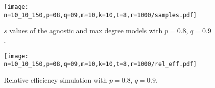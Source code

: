 \documentclass{article}
\begin{document}
\begin{figure}[h]
\centering
\texttt{[image: n=10\_10\_150,p=08,q=09,m=10,k=10,t=8,r=1000/samples.pdf]}
\caption{$s$ values of the agnostic and max degree models with $p=0.8$, $q=0.9$.}
\label{fig:p08_q09_s_val}
\end{figure}
\begin{figure}[h]
\centering
\texttt{[image: n=10\_10\_150,p=08,q=09,m=10,k=10,t=8,r=1000/rel\_eff.pdf]}
\caption{Relative efficiency simulation with $p=0.8$, $q=0.9$.}
\label{fig:p08_q09_rel_eff}
\end{figure}






\end{document}
